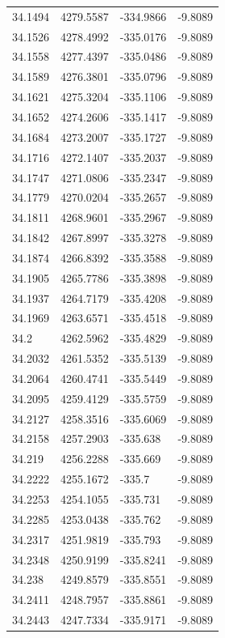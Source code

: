 \begin{table}[H]
\begin{tabular}{llll}
34.1494 & 4279.5587 & -334.9866 & -9.8089 \\
34.1526 & 4278.4992 & -335.0176 & -9.8089 \\
34.1558 & 4277.4397 & -335.0486 & -9.8089 \\
34.1589 & 4276.3801 & -335.0796 & -9.8089 \\
34.1621 & 4275.3204 & -335.1106 & -9.8089 \\
34.1652 & 4274.2606 & -335.1417 & -9.8089 \\
34.1684 & 4273.2007 & -335.1727 & -9.8089 \\
34.1716 & 4272.1407 & -335.2037 & -9.8089 \\
34.1747 & 4271.0806 & -335.2347 & -9.8089 \\
34.1779 & 4270.0204 & -335.2657 & -9.8089 \\
34.1811 & 4268.9601 & -335.2967 & -9.8089 \\
34.1842 & 4267.8997 & -335.3278 & -9.8089 \\
34.1874 & 4266.8392 & -335.3588 & -9.8089 \\
34.1905 & 4265.7786 & -335.3898 & -9.8089 \\
34.1937 & 4264.7179 & -335.4208 & -9.8089 \\
34.1969 & 4263.6571 & -335.4518 & -9.8089 \\
34.2 & 4262.5962 & -335.4829 & -9.8089 \\
34.2032 & 4261.5352 & -335.5139 & -9.8089 \\
34.2064 & 4260.4741 & -335.5449 & -9.8089 \\
34.2095 & 4259.4129 & -335.5759 & -9.8089 \\
34.2127 & 4258.3516 & -335.6069 & -9.8089 \\
34.2158 & 4257.2903 & -335.638 & -9.8089 \\
34.219 & 4256.2288 & -335.669 & -9.8089 \\
34.2222 & 4255.1672 & -335.7 & -9.8089 \\
34.2253 & 4254.1055 & -335.731 & -9.8089 \\
34.2285 & 4253.0438 & -335.762 & -9.8089 \\
34.2317 & 4251.9819 & -335.793 & -9.8089 \\
34.2348 & 4250.9199 & -335.8241 & -9.8089 \\
34.238 & 4249.8579 & -335.8551 & -9.8089 \\
34.2411 & 4248.7957 & -335.8861 & -9.8089 \\
34.2443 & 4247.7334 & -335.9171 & -9.8089 \\

\end{tabular}
\end{table}
